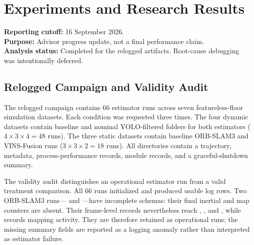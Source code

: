 \chapter{Experiments and Research Results}
\label{chap:results}

\noindent\textbf{Reporting cutoff:} 16 September 2026.\\
\textbf{Purpose:} Advisor progress update, not a final performance claim.\\
\textbf{Analysis status:} Completed for the relogged artifacts. Root-cause
debugging was intentionally deferred.

\section{Relogged Campaign and Validity Audit}
\label{sec:results-validity}

The relogged campaign contains 66 estimator runs across seven featureless-floor
simulation datasets. Each condition was requested three times. The four dynamic
datasets contain baseline and nominal YOLO-filtered folders for both estimators
($4\times3\times4=48$ runs). The three static datasets contain baseline
ORB-SLAM3 and VINS-Fusion runs ($3\times3\times2=18$ runs). All directories
contain a trajectory, metadata, process-performance records, module records, and
a graceful-shutdown summary.

The validity audit distinguishes an operational estimator run from a valid
treatment comparison. All 66 runs initialized and produced usable log rows.
Two ORB-SLAM3 runs---
and ---have incomplete  schemas:
their final inertial and map counters are absent. Their frame-level
 records nevertheless reach ,
, and , while
 records mapping activity. They are therefore retained
as operational runs; the missing summary fields are reported as a logging
anomaly rather than interpreted as estimator failure.

